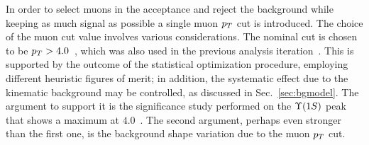 In order to select muons in the acceptance and reject the background while keeping as much signal as possible a single muon $p_T$ cut is introduced. 
The choice of the muon \pt cut value involves various considerations. 
The nominal cut is chosen to be $p_T>4.0$~\GeVc, which was also used in the previous analysis iteration~\cite{prl}.
This is supported by the outcome of the statistical optimization procedure, employing different heuristic figures of merit; in addition, 
the systematic effect due to the kinematic background may be controlled, as discussed in Sec.~\ref{sec:bgmodel}. 
The argument to support it is the significance study performed on the $\Upsilon(1S)$ peak that shows a maximum at $4.0$~\GeVc.
The second argument, perhaps even stronger than the first one, is the background shape variation due to the muon $p_T$ cut. 




